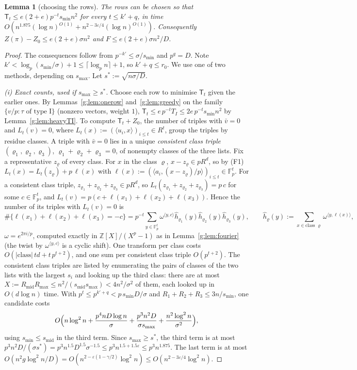 \documentclass[11pt]{article}
\newtheorem{lemma}[theorem]{Lemma}
\theoremstyle{definition}
\theoremstyle{remark}
\newcommand{\Z}{\mathbb{Z}}
\newcommand{\Fp}{\mathbb{F}_p}
\newcommand{\eps}{\varepsilon}
\begin{document}
\begin{lemma}[choosing the rows]\label{g:lem:Hrows}
The rows can be chosen so that $\mathsf T_t\le e(2+e)p^{-t}s_{\min}n^2$ for every $t\le k'+q$, in time $O(n^{1.875}(\log n)^{O(1)}+n^{2-3\eps/4}(\log n)^{O(1)})$. Consequently $Z(\pi)-Z_0\le e(2+e)\sigma n^2$ and $F\le e(2+e)\sigma n^2/D$.
\end{lemma}
\begin{proof}
The consequences follow from $p^{-k'}\le\sigma/s_{\min}$ and $p^q=D$. Note $k'<\log_p(s_{\min}/\sigma)+1\le\lceil\log_pn\rceil+1$, so $k'+q\le r_0$. We use one of two methods, depending on $s_{\max}$. Let $s^*:=\sqrt{n\sigma/D}$.

\emph{(i) Exact counts, used if $s_{\max}\ge s^*$.} Choose each row to minimise $\mathsf T_t$ given the earlier ones. By Lemmas~\ref{g:lem:onerow} and~\ref{g:lem:greedy} on the family $\{v/p:\tau\text{ of type I}\}$ (nonzero vectors, weight $1$), $\mathsf T_t\le e\,p^{-t}T_I\le2e\,p^{-t}s_{\min}n^2$ by Lemma~\ref{g:lem:heavyTI}. To compute $\mathsf T_t+Z_0$, the number of triples with $\bar v=0$ and $L_t(v)=0$, where $L_t(x):=(\langle u_i,x\rangle)_{i\le t}\in R^t$, group the triples by residue classes. A triple with $\bar v=0$ lies in a unique \emph{consistent class triple} $(\varrho_1,\varrho_2,\varrho_3)$, $\varrho_1+\varrho_2+\varrho_3=0$, of nonempty classes of the three lists. Fix a representative $z_\varrho$ of every class. For $x$ in the class $\varrho$, $x-z_\varrho\in pR^d$, so by (F1) $L_t(x)=L_t(z_\varrho)+p\,\ell(x)$ with $\ell(x):=(\langle a_i,(x-z_\varrho)/p\rangle)_{i\le t}\in\Fp^t$. For a consistent class triple, $z_{\varrho_1}+z_{\varrho_2}+z_{\varrho_3}\in pR^d$, so $L_t(z_{\varrho_1}+z_{\varrho_2}+z_{\varrho_3})=p\,c$ for some $c\in\Fp^t$, and $L_t(v)=p(c+\ell(x_1)+\ell(x_2)+\ell(x_3))$. Hence the number of its triples with $L_t(v)=0$ is
\[
\#\{\ell(x_1)+\ell(x_2)+\ell(x_3)=-c\}=p^{-t}\sum_{y\in\Fp^t}\omega^{\langle y,c\rangle}\hat h_{\varrho_1}(y)\hat h_{\varrho_2}(y)\hat h_{\varrho_3}(y),\qquad\hat h_\varrho(y):=\sum_{x\in\text{class }\varrho}\omega^{\langle y,\ell(x)\rangle},
\]
$\omega=e^{2\pi i/p}$, computed exactly in $\Z[X]/(X^p-1)$ as in Lemma~\ref{g:lem:fourier} (the twist by $\omega^{\langle y,c\rangle}$ is a cyclic shift). One transform per class costs $O(|\text{class}|\,td+t\,p^{t+2})$, and one sum per consistent class triple $O(p^{t+2})$. The consistent class triples are listed by enumerating the pairs of classes of the two lists with the largest $s_i$ and looking up the third class: there are at most $X:=R_{\mathrm{mid}}R_{\max}\le n^2/(s_{\mathrm{mid}}s_{\max})<4n^2/\sigma^2$ of them, each looked up in $O(d\log n)$ time. With $p^t\le p^{k'+q}<p\,s_{\min}D/\sigma$ and $R_1+R_2+R_3\le3n/s_{\min}$, one candidate costs
\[
O\Bigl(n\log^2n+\frac{p^4nD\log n}\sigma+\frac{p^3n^2D}{\sigma s_{\max}}+\frac{n^2\log^2n}{\sigma^2}\Bigr),
\]
using $s_{\min}\le s_{\mathrm{mid}}$ in the third term. Since $s_{\max}\ge s^*$, the third term is at most $p^3n^2D/(\sigma s^*)=p^3n^{1.5}D^{1.5}\sigma^{-1.5}\le p^3n^{1.5+1.5\eps}\le p^3n^{1.875}$. The last term is at most $O(n^2g\log^2n/D)=O(n^{2-\eps(1-\gamma/2)}\log^2n)\le O(n^{2-3\eps/4}\log^2n)$.


\end{proof}
\end{document}
